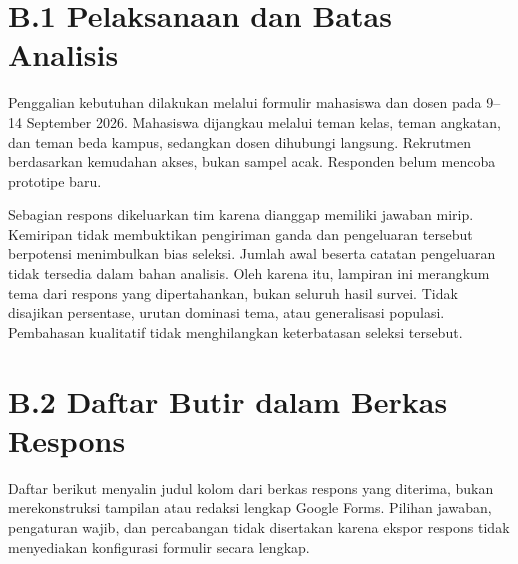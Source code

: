 \documentclass[12pt,a4paper,oneside]{report}
\begin{document}
\section*{B.1 Pelaksanaan dan Batas Analisis}
Penggalian kebutuhan dilakukan melalui formulir mahasiswa dan dosen pada 9--14 September 2026. Mahasiswa dijangkau melalui teman kelas, teman angkatan, dan teman beda kampus, sedangkan dosen dihubungi langsung. Rekrutmen berdasarkan kemudahan akses, bukan sampel acak. Responden belum mencoba prototipe baru.

Sebagian respons dikeluarkan tim karena dianggap memiliki jawaban mirip. Kemiripan tidak membuktikan pengiriman ganda dan pengeluaran tersebut berpotensi menimbulkan bias seleksi. Jumlah awal beserta catatan pengeluaran tidak tersedia dalam bahan analisis. Oleh karena itu, lampiran ini merangkum tema dari respons yang dipertahankan, bukan seluruh hasil survei. Tidak disajikan persentase, urutan dominasi tema, atau generalisasi populasi. Pembahasan kualitatif tidak menghilangkan keterbatasan seleksi tersebut.

\section*{B.2 Daftar Butir dalam Berkas Respons}
Daftar berikut menyalin judul kolom dari berkas respons yang diterima, bukan merekonstruksi tampilan atau redaksi lengkap Google Forms. Pilihan jawaban, pengaturan wajib, dan percabangan tidak disertakan karena ekspor respons tidak menyediakan konfigurasi formulir secara lengkap.
\end{document}
